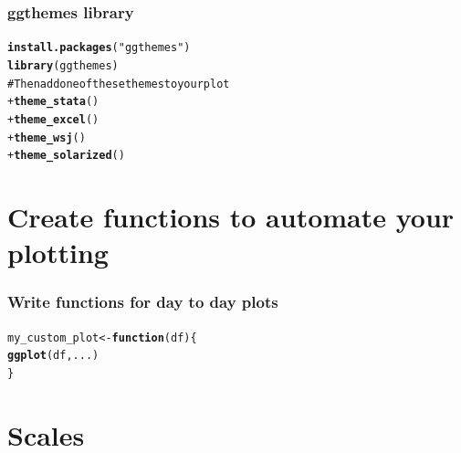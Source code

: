 \documentclass{beamer}\usepackage{graphicx, color}
\makeatletter
\newcommand{\hlfunctioncall}[1]{\textcolor[rgb]{0.501960784313725,0,0.329411764705882}{\textbf{#1}}}%
\newcommand{\hlstring}[1]{\textcolor[rgb]{0.6,0.6,1}{#1}}%
\newcommand{\hlcomment}[1]{\textcolor[rgb]{0.180392156862745,0.6,0.341176470588235}{#1}}%
\newenvironment{kframe}{%
 \def\at@end@of@kframe{}%
 \ifinner\ifhmode%
  \def\at@end@of@kframe{\end{minipage}}%
  \begin{minipage}{\columnwidth}%
 \fi\fi%
 \def\FrameCommand##1{\hskip\@totalleftmargin \hskip-\fboxsep
 \colorbox{shadecolor}{##1}\hskip-\fboxsep
     \hskip-\linewidth \hskip-\@totalleftmargin \hskip\columnwidth}%
 \MakeFramed {\advance\hsize-\width
   \@totalleftmargin\z@ \linewidth\hsize
   \@setminipage}}%
 {\par\unskip\endMakeFramed%
 \at@end@of@kframe}
\newenvironment{knitrout}{}{} %
\makeatother
\begin{document}
\begin{frame}[fragile]
\frametitle{ggthemes library}
\begin{knitrout}\footnotesize
{}\color{fgcolor}\begin{kframe}
\begin{alltt}
\hlfunctioncall{install.packages}(\hlstring{"ggthemes"})
\hlfunctioncall{library}(ggthemes)
\hlcomment{# Then add one of these themes to your plot}
+\hlfunctioncall{theme_stata}()
+\hlfunctioncall{theme_excel}()
+\hlfunctioncall{theme_wsj}()
+\hlfunctioncall{theme_solarized}()
\end{alltt}
\end{kframe}
\end{knitrout}

\end{frame}


\section*{Create functions to automate your plotting}
\frame{\sectionpage}

\begin{frame}[fragile]
\frametitle{Write functions for day to day plots}
\begin{knitrout}\footnotesize
{}\color{fgcolor}\begin{kframe}
\begin{alltt}
my_custom_plot <- \hlfunctioncall{function}(df) \{
    \hlfunctioncall{ggplot}(df, ...)
\}
\end{alltt}
\end{kframe}
\end{knitrout}

\end{frame}

\section*{Scales}
\frame{\sectionpage}
\end{document}
